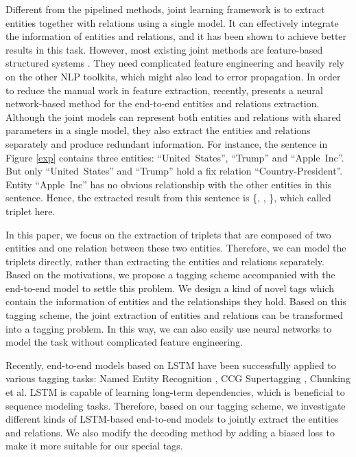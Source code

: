 \documentclass[11pt,a4paper]{article}
\begin{document}
Different from the pipelined methods,
joint learning framework is to extract entities together with relations using a single model.
It can effectively integrate the information of entities and relations, and
it has been shown to achieve better results in this task.
However, most existing joint methods are feature-based structured systems \cite{li2014,miwa2014modeling,yu2010colling,ren2016cotype}.
They need complicated feature engineering and heavily rely on the other NLP toolkits,
which might also lead to error propagation.
In order to reduce the manual work in feature extraction, recently,
\cite{miwa2016end} presents a neural network-based method for the end-to-end entities and relations extraction.
Although the joint models can represent both entities and relations with shared parameters in a single model,
they also extract the entities and relations separately and produce redundant information.
For instance, the sentence in Figure \ref{exp} contains three entities: ``United~States'', ``Trump'' and ``Apple~Inc''.
But only ``United~States'' and ``Trump'' hold a fix relation ``Country-President''.
Entity ``Apple~Inc'' has no obvious relationship with the other entities in this sentence.
Hence, the extracted result from this sentence is \{, , \}, which called triplet here.

In this paper, we focus on the extraction of triplets that are composed of two entities and one relation between these two entities.
Therefore, we can model the triplets directly, rather than extracting the entities and relations separately.
Based on the motivations, we propose a tagging scheme accompanied with the end-to-end model to settle this problem.
We design a kind of novel tags which contain the information of entities and the relationships they hold.
Based on this tagging scheme, the joint extraction of entities and relations can be transformed into a tagging problem.
In this way, we can also easily use neural networks to model the task  without complicated feature engineering.

Recently, end-to-end models based on LSTM \cite{lstm97} have been successfully applied to various tagging tasks:
Named Entity Recognition \cite{lstm-crf}, CCG Supertagging \cite{supertagging}, Chunking \cite{chunk} et al.
LSTM is capable of learning long-term dependencies, which is beneficial to sequence modeling tasks.
Therefore, based on our tagging scheme,
we investigate different kinds of LSTM-based end-to-end models to jointly extract the entities and relations.
We also modify the decoding method by adding a biased loss to make it more suitable for our special tags.
\end{document}
